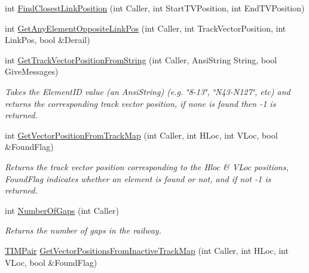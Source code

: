 \begin{DoxyCompactItemize}
int \mbox{\hyperlink{class_t_track_a0510eacbf80200ff27d991606acf9924}{Find\+Closest\+Link\+Position}} (int Caller, int Start\+T\+V\+Position, int End\+T\+V\+Position)
\item 
int \mbox{\hyperlink{class_t_track_a5b63dde2b21a37d5db7e4d078b03a74c}{Get\+Any\+Element\+Opposite\+Link\+Pos}} (int Caller, int Track\+Vector\+Position, int Link\+Pos, bool \&Derail)
\item 
\mbox{\label{class_t_track_a54d3b9daeb9ec0b45b0672e7273bf575}} 
int \mbox{\hyperlink{class_t_track_a54d3b9daeb9ec0b45b0672e7273bf575}{Get\+Track\+Vector\+Position\+From\+String}} (int Caller, Ansi\+String String, bool Give\+Messages)
\begin{DoxyCompactList}\small\item\em Takes the Element\+ID value (an Ansi\+String) (e.\+g. \char`\"{}8-\/13\char`\"{}, \char`\"{}\+N43-\/\+N127\char`\"{}, etc) and returns the corresponding track vector position, if none is found then -\/1 is returned. \end{DoxyCompactList}\item 
\mbox{\label{class_t_track_aa0812972d1ae27198c5fbca8aa7b6134}} 
int \mbox{\hyperlink{class_t_track_aa0812972d1ae27198c5fbca8aa7b6134}{Get\+Vector\+Position\+From\+Track\+Map}} (int Caller, int H\+Loc, int V\+Loc, bool \&Found\+Flag)
\begin{DoxyCompactList}\small\item\em Returns the track vector position corresponding to the Hloc \& V\+Loc positions, Found\+Flag indicates whether an element is found or not, and if not -\/1 is returned. \end{DoxyCompactList}\item 
\mbox{\label{class_t_track_a72c171ba53777dc2f5fab90877f9bc45}} 
int \mbox{\hyperlink{class_t_track_a72c171ba53777dc2f5fab90877f9bc45}{Number\+Of\+Gaps}} (int Caller)
\begin{DoxyCompactList}\small\item\em Returns the number of gaps in the railway. \end{DoxyCompactList}\item 
\mbox{\label{class_t_track_a418966e6fefb71b9d0c9b941197832da}} 
\mbox{\hyperlink{class_t_track_ae0a83809dc6f3dabb0f8fd8e9464ac70}{T\+I\+M\+Pair}} \mbox{\hyperlink{class_t_track_a418966e6fefb71b9d0c9b941197832da}{Get\+Vector\+Positions\+From\+Inactive\+Track\+Map}} (int Caller, int H\+Loc, int V\+Loc, bool \&Found\+Flag)

\end{DoxyCompactItemize}
